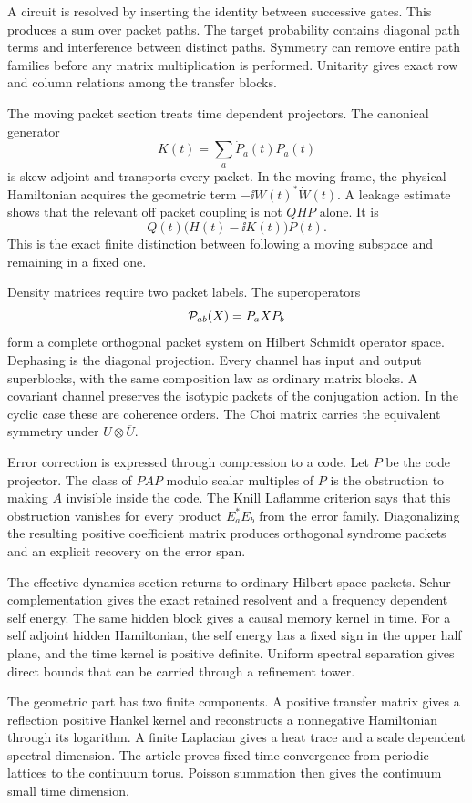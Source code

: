 A circuit is resolved by inserting the identity between successive gates. This produces a sum over packet paths. The target probability contains diagonal path terms and interference between distinct paths. Symmetry can remove entire path families before any matrix multiplication is performed. Unitarity gives exact row and column relations among the transfer blocks.

The moving packet section treats time dependent projectors. The canonical generator
\[
K(t)=\sum_a\dot P_a(t)P_a(t)
\]
is skew adjoint and transports every packet. In the moving frame, the physical Hamiltonian acquires the geometric term \(-\ii W(t)^*\dot W(t)\). A leakage estimate shows that the relevant off packet coupling is not \(QHP\) alone. It is
\[
Q(t)\bigl(H(t)-\ii K(t)\bigr)P(t).
\]
This is the exact finite distinction between following a moving subspace and remaining in a fixed one.

Density matrices require two packet labels. The superoperators
\[
\Pcal_{ab}(X)=P_aXP_b
\]
form a complete orthogonal packet system on Hilbert Schmidt operator space. Dephasing is the diagonal projection. Every channel has input and output superblocks, with the same composition law as ordinary matrix blocks. A covariant channel preserves the isotypic packets of the conjugation action. In the cyclic case these are coherence orders. The Choi matrix carries the equivalent symmetry under \(U\otimes\overline U\).

Error correction is expressed through compression to a code. Let \(P\) be the code projector. The class of \(PAP\) modulo scalar multiples of \(P\) is the obstruction to making \(A\) invisible inside the code. The Knill Laflamme criterion says that this obstruction vanishes for every product \(E_a^*E_b\) from the error family. Diagonalizing the resulting positive coefficient matrix produces orthogonal syndrome packets and an explicit recovery on the error span.

The effective dynamics section returns to ordinary Hilbert space packets. Schur complementation gives the exact retained resolvent and a frequency dependent self energy. The same hidden block gives a causal memory kernel in time. For a self adjoint hidden Hamiltonian, the self energy has a fixed sign in the upper half plane, and the time kernel is positive definite. Uniform spectral separation gives direct bounds that can be carried through a refinement tower.

The geometric part has two finite components. A positive transfer matrix gives a reflection positive Hankel kernel and reconstructs a nonnegative Hamiltonian through its logarithm. A finite Laplacian gives a heat trace and a scale dependent spectral dimension. The article proves fixed time convergence from periodic lattices to the continuum torus. Poisson summation then gives the continuum small time dimension.

